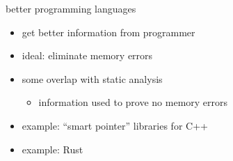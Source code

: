 
\begin{frame}{better programming languages}
    \begin{itemize}
        \item get better information from programmer
        \item ideal: eliminate memory errors 
        \item some overlap with static analysis
            \begin{itemize}
                \item information used to prove no memory errors
            \end{itemize}
        \item example: ``smart pointer'' libraries for C++
        \item example: Rust
    \end{itemize}
\end{frame}


